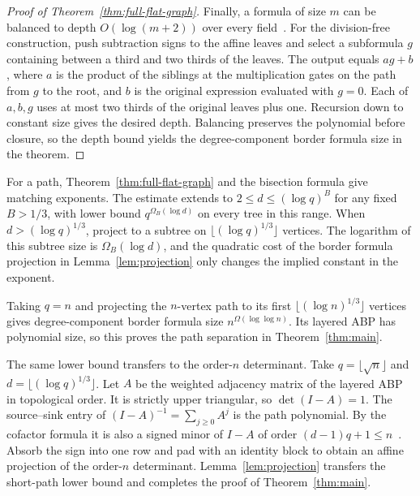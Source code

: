 \begin{proof}[Proof of Theorem~\ref{thm:full-flat-graph}]
Finally, a formula of size $m$ can be balanced to depth
$O(\log(m+2))$ over every field~\cite{Brent}. For the division-free
construction, push subtraction signs to the affine leaves and select
a subformula $g$ containing between a third and two thirds of the
leaves. The output equals $ag+b$, where $a$ is the product of the
siblings at the multiplication gates on the path from $g$ to the
root, and $b$ is the original expression evaluated with $g=0$.
Each of $a,b,g$ uses at most two thirds of the original leaves plus
one. Recursion down to constant size gives the desired depth.
Balancing preserves the polynomial before closure, so the depth
bound yields the degree-component border formula size in the theorem.
\end{proof}

For a path, Theorem~\ref{thm:full-flat-graph} and the bisection formula
give matching exponents. The estimate extends to
$2\le d\le(\log q)^B$ for any fixed $B>1/3$, with lower bound
$q^{\Omega_B(\log d)}$ on every tree in this range. When
$d>(\log q)^{1/3}$, project to a subtree on
$\lfloor(\log q)^{1/3}\rfloor$ vertices. The logarithm of this
subtree size is $\Omega_B(\log d)$, and the quadratic cost of the
border formula projection in Lemma~\ref{lem:projection} only changes
the implied constant in the exponent.

Taking $q=n$ and projecting the $n$-vertex path to its first
$\lfloor(\log n)^{1/3}\rfloor$ vertices gives degree-component
border formula size $n^{\Omega(\log\log n)}$. Its layered ABP has
polynomial size, so this proves the path separation in
Theorem~\ref{thm:main}.

The same lower bound transfers to the order-$n$ determinant. Take
$q=\lfloor\sqrt n\rfloor$ and $d=\lfloor(\log q)^{1/3}\rfloor$.
Let $A$ be the weighted adjacency matrix of the layered ABP in
topological order. It is strictly upper triangular, so
$\det(I-A)=1$. The source--sink entry of
$(I-A)^{-1}=\sum_{j\ge0}A^j$ is the path polynomial. By the
cofactor formula it is also a signed minor of $I-A$ of order
$(d-1)q+1\le n$~\cite{Valiant,MalodPortier}. Absorb the sign into
one row and pad with an identity block to obtain an affine projection
of the order-$n$ determinant. Lemma~\ref{lem:projection} transfers
the short-path lower bound and completes the proof of
Theorem~\ref{thm:main}.
